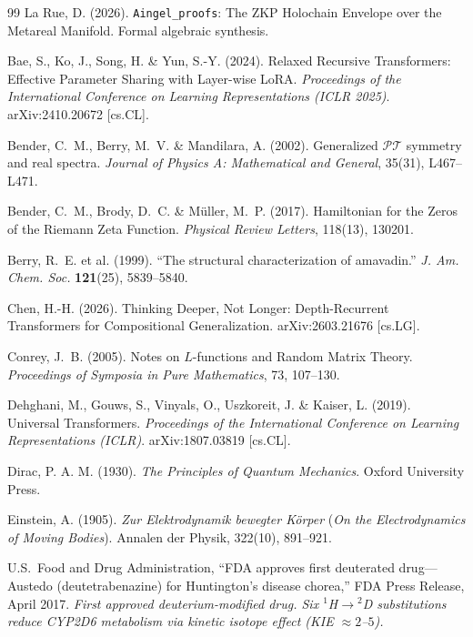 \documentclass[12pt,oneside]{book}
\begin{document}


\vspace{2em}
\begin{thebibliography}{99}
La Rue, D. (2026).
\texttt{Aingel\_proofs}: The ZKP Holochain Envelope over the Metareal Manifold.
Formal algebraic synthesis.

Bae, S., Ko, J., Song, H. \& Yun, S.-Y. (2024).
Relaxed Recursive Transformers: Effective Parameter Sharing with Layer-wise LoRA.
\textit{Proceedings of the International Conference on Learning Representations (ICLR 2025)}.
arXiv:2410.20672 [cs.CL].

Bender, C.~M., Berry, M.~V. \& Mandilara, A. (2002).
Generalized $\mathcal{PT}$ symmetry and real spectra.
\textit{Journal of Physics A: Mathematical and General}, 35(31), L467--L471.

Bender, C.~M., Brody, D.~C. \& M\"uller, M.~P. (2017).
Hamiltonian for the Zeros of the Riemann Zeta Function.
\textit{Physical Review Letters}, 118(13), 130201.

Berry, R.~E. et al. (1999).
``The structural characterization of amavadin.''
\textit{J. Am. Chem. Soc.} \textbf{121}(25), 5839--5840.

Chen, H.-H. (2026).
Thinking Deeper, Not Longer: Depth-Recurrent Transformers for Compositional Generalization.
arXiv:2603.21676 [cs.LG].

Conrey, J.~B. (2005).
Notes on $L$-functions and Random Matrix Theory.
\textit{Proceedings of Symposia in Pure Mathematics}, 73, 107--130.

Dehghani, M., Gouws, S., Vinyals, O., Uszkoreit, J. \& Kaiser, L. (2019).
Universal Transformers.
\textit{Proceedings of the International Conference on Learning Representations (ICLR)}.
arXiv:1807.03819 [cs.CL].

Dirac, P. A. M. (1930).
\textit{The Principles of Quantum Mechanics}.
Oxford University Press.

Einstein, A. (1905).
\textit{Zur Elektrodynamik bewegter Körper} (\textit{On the Electrodynamics of Moving Bodies}).
Annalen der Physik, 322(10), 891--921.

U.S.~Food and Drug Administration,
``FDA approves first deuterated drug---Austedo (deutetrabenazine) for Huntington's disease chorea,''
FDA Press Release, April 2017.
\textit{First approved deuterium-modified drug. Six ${}^1$H$\to$${}^2$D substitutions reduce CYP2D6 metabolism via kinetic isotope effect (KIE $\approx 2$--$5$).}


\end{thebibliography}
\end{document}
